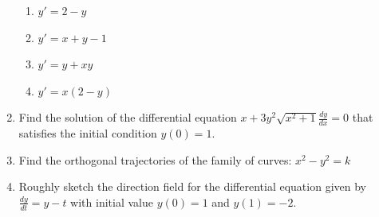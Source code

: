 \documentclass[12pt]{article}
\begin{document}
\begin{enumerate}
\begin{enumerate}
    \item $y'=2-y$
    \item $y'=x+y-1$
    \item $y'=y+xy$
    \item $y'=x(2-y)$
\end{enumerate}
\item Find the solution of the differential equation $x+3y^2\sqrt{x^2+1}\frac{dy}{dx}=0$ that satisfies the  initial condition $y(0)=1$.
\vfill
\newpage
\item Find the orthogonal trajectories of the family of curves: $x^2-y^2=k$
\vfill
\item Roughly sketch the direction field for the differential equation given by $\frac{dy}{dt}=y-t$ with initial value $y(0)=1$ and $y(1)=-2$.
\vfill

\end{enumerate}
\end{document}
